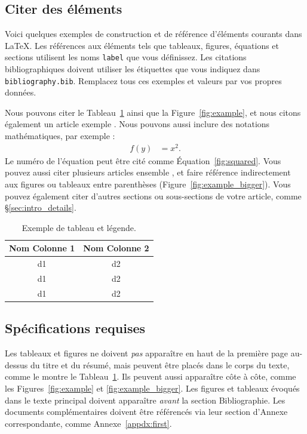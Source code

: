 \documentclass[fra]{anthology-ch}         %
\begin{document}
\subsection{Citer des éléments}

Voici quelques exemples de construction et de référence d’éléments courants dans LaTeX. Les références aux éléments tels que tableaux, figures, équations et sections utilisent les noms \texttt{label} que vous définissez. Les citations bibliographiques doivent utiliser les étiquettes que vous indiquez dans \texttt{bibliography.bib}. Remplacez tous ces exemples et valeurs par vos propres données. 

Nous pouvons citer le Tableau~\ref{tab:example} ainsi que la Figure~\ref{fig:example}, et nous citons également un article exemple \cite{tettoni2024discoverability}.
Nous pouvons aussi inclure des notations mathématiques, par exemple :
\begin{align}
f(y) &= x^2. \label{fig:squared}
\end{align}
Le numéro de l’équation peut être cité comme
Équation~\ref{fig:squared}. Vous pouvez aussi citer plusieurs articles ensemble \cite{barré2024latent, levenson2024textual, bambaci2024steps}, et faire référence indirectement aux figures ou tableaux entre parenthèses (Figure~\ref{fig:example_bigger}). Vous pouvez également citer d’autres sections ou sous-sections de votre article, comme \S\ref{sec:intro_details}. 

\begin{table}[h]
  \centering 
  \begin{tabular}{cc}
    \toprule
    Nom Colonne 1 & Nom Colonne 2\\
    \midrule
    d1 & d2 \\
    d1 & d2 \\
    d1 & d2 \\
    \bottomrule
  \end{tabular}
  \caption{Exemple de tableau et légende.}
  \label{tab:example}
\end{table}


\subsection{Spécifications requises}

Les tableaux et figures ne doivent \textit{pas} apparaître en haut de la première page au-dessus du titre et du résumé, mais peuvent être placés dans le corps du texte, comme le montre le Tableau~\ref{tab:example}. Ils peuvent aussi apparaître côte à côte, comme les Figures~\ref{fig:example} et \ref{fig:example_bigger}. Les figures et tableaux évoqués dans le texte principal doivent apparaître \textit{avant} la section Bibliographie. Les documents complémentaires doivent être référencés via leur section d’Annexe correspondante, comme Annexe~\ref{appdx:first}. 
\end{document}
